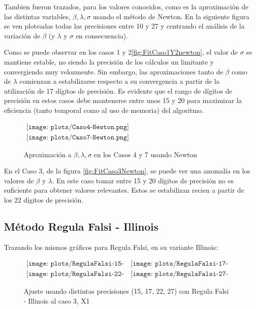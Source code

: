 Tambien fueron trazados, para los valores conocidos, como es la 
aproximaci\'on de las distintas variables, $\beta, \lambda, \sigma$ usando el 
m\'etodo de Newton. En la siguiente figura se ven ploteadas todas las 
precisiones entre 10 y 27 y centrando el an\'alisis de la variaci\'on de 
$\beta$ (y $\lambda$ y $\sigma$ en consecuencia).

Como se puede observar en los casos 1 y 2\ref{fig:FitCaso1Y2newton}, el valor de $\sigma$ se mantiene 
estable, no siendo la precisi\'on de los c\'alculos un limitante y convergiendo 
muy velozmente. Sin embargo, las aproximaciones tanto de $\beta$ como de 
$\lambda$ comienzan a estabilizarse respecto a su convergencia a partir de la 
utilizaci\'on de 17 d\'igitos de precisi\'on. Es evidente que el rango de 
d\'igitos de precisi\'on en estos casos debe mantenerse entre unos 15 y 20 
para maximizar la eficiencia (tanto temporal como al uso de memoria) del 
algoritmo.  

\begin{figure} [H]
$\begin{array}{c}
\texttt{[image: plots/Caso4-Newton.png]} \\
\texttt{[image: plots/Caso7-Newton.png]}
\end{array}$
\caption{Aproximaci\'on a $\beta, \lambda, \sigma$ en los Casos 4 y 7 
usando Newton}
\label{fig:Fit4Y7Newton}
\end{figure}

En el Caso 3, de la figura \ref{fig:FitCaso3Newton}, se puede ver una anomal\'ia en los valores de $\beta$ y $\lambda$. 
En este caso tomar entre 15 y 20 d\'igitos de precisi\'on no es suficiente para 
obtener valores relevantes. Estos se estabilizan recien a partir de los 22 
d\'igitos de precisi\'on.


\subsection{M\'etodo Regula Falsi - Illinois}

Trazando los mismos gr\'aficos para Regula Falsi, en su variante Illinois:

\begin{figure} [H]
$\begin{array}{cc}
\texttt{[image: plots/RegulaFalsi-15-caso3.png]} &
\texttt{[image: plots/RegulaFalsi-17-caso3.png]} \\
\texttt{[image: plots/RegulaFalsi-22-caso3.png]} &
\texttt{[image: plots/RegulaFalsi-27-caso3.png]}
\end{array}$
\caption{Ajuste usando distintas precisiones (15, 17, 22, 27) con 
Regula Falsi - Illinois al caso 3, X1}
\label{fig:FitCaso3RegulaFalsi}
\end{figure}

